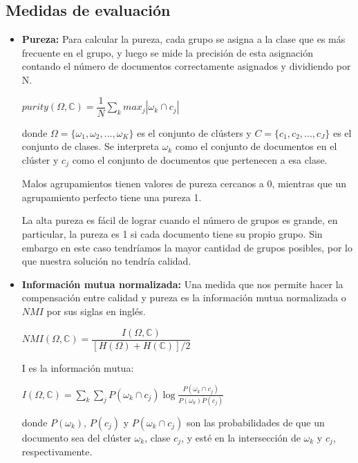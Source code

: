 \documentclass{llncs}
\begin{document}
\subsection{Medidas de evaluaci\'on}
\begin{itemize}
	\item \textbf{Pureza:} Para calcular la pureza, cada grupo se asigna a la clase que es más frecuente en el grupo, y luego se mide la precisión de esta asignación contando el número de documentos correctamente asignados y dividiendo por N.
	
	\begin{center}
		$purity(\Omega, \mathbb{C}) = \dfrac{1}{N} \sum_{k}max_{j} |\omega_{k} \cap c_{j}| $
	\end{center}
	
	donde $ \Omega = \{\omega_{1}, \omega_{2}, ... , \omega_{K}\} $ es el conjunto de cl\'usters y $ C = \{c_{1}, c_{2}, ... , c_{J}\} $ es el conjunto de clases. Se interpreta $ \omega_{k} $ como el conjunto de documentos en el cl\'uster y $ c_{j} $ como el conjunto de documentos que pertenecen a esa clase.
	
	Malos agrupamientos tienen valores de pureza cercanos a 0, mientras que un agrupamiento perfecto tiene una pureza 1.
	
	La alta pureza es fácil de lograr cuando el número de grupos es grande, en particular, la pureza es 1 si cada documento tiene su propio grupo. Sin embargo en este caso tendr\'iamos la mayor cantidad de grupos posibles, por lo que nuestra soluci\'on no tendr\'ia calidad.
	
	\vspace{1em}
	\item \textbf{Información mutua normalizada:} Una medida que nos permite hacer la compensaci\'on entre calidad y pureza es la información mutua normalizada o $ NMI $ por sus siglas en ingl\'es.
	
	\begin{center}
		$ NMI(\Omega, \mathbb{C}) = \dfrac{I(\Omega, \mathbb{C})}{[H(\Omega) + H(\mathbb{C})]/2}
		$
	\end{center}
	
	I es la informaci\'on mutua:
	\begin{center}
		$ I(\Omega, \mathbb{C}) = \sum_{k}\sum_{j}P(\omega_{k} \cap c_{j})\log\frac{P(\omega_{k} \cap c_{j})}{P(\omega_{k})P(c_{j})} $
	\end{center}
	donde $ P(\omega_{k}) $, $ P(c_{j}) $ y $ P(\omega_{k} \cap c_{j}) $ son las probabilidades de que un documento sea del cl\'uster $ \omega_{k} $, clase $ c_{j} $, y est\'e en la intersección de $ \omega_{k} $ y $ c_{j} $, respectivamente.
	

\end{itemize}
\end{document}

